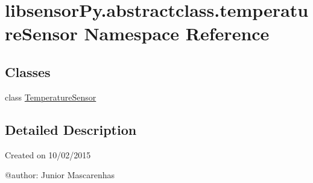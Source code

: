 \hypertarget{namespacelibsensorPy_1_1abstractclass_1_1temperatureSensor}{}\section{libsensor\+Py.\+abstractclass.\+temperature\+Sensor Namespace Reference}
\label{namespacelibsensorPy_1_1abstractclass_1_1temperatureSensor}
\subsection*{Classes}
\begin{DoxyCompactItemize}
\item 
class \hyperlink{classlibsensorPy_1_1abstractclass_1_1temperatureSensor_1_1TemperatureSensor}{Temperature\+Sensor}
\end{DoxyCompactItemize}


\subsection{Detailed Description}
\begin{DoxyVerb}Created on 10/02/2015

@author: Junior Mascarenhas
\end{DoxyVerb}
 